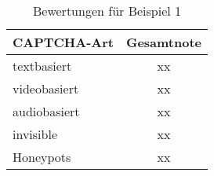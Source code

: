 \begin{table}[h!]
    \caption{Bewertungen für Beispiel 1}
    \begin{center}
        \begin{tabular}{l|c}
            CAPTCHA-Art                       & Gesamtnote \\\hline
            textbasiert            & xx        \\
            videobasiert                   & xx       \\
            audiobasiert        & xx         \\
            invisible                      & xx         \\
            Honeypots & xx

        \end{tabular}
    \end{center}
\end{table}
